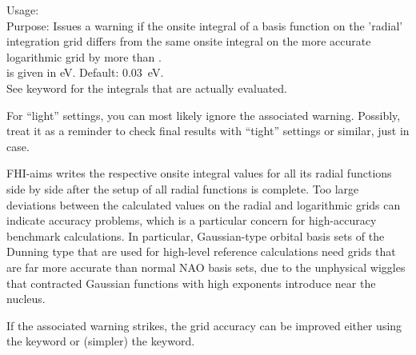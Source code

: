 



{
  \noindent
  Usage:   \\[1.0ex]
  Purpose: Issues a warning if the onsite integral of a basis function on 
    the 'radial' integration grid differs from the same onsite integral on
    the more accurate logarithmic grid by more than . \\[1.0ex]
   is given in eV. Default: 0.03~eV. \\
}
See keyword  
for the integrals that are actually evaluated.

For ``light'' settings, you can most likely ignore the associated warning. 
Possibly, treat it as a reminder to check final results with ``tight'' 
settings or similar, just in case.

FHI-aims writes the respective onsite integral values for all its
radial functions side by side after the setup of all radial functions
is complete. Too large deviations between the calculated values on the
radial and logarithmic grids can indicate accuracy problems, which is
a particular concern for high-accuracy benchmark calculations. In
particular, Gaussian-type orbital basis sets of the Dunning type that
are used for high-level reference calculations need grids that are far
more accurate than normal NAO basis sets, due to the unphysical
wiggles that contracted Gaussian functions with high exponents
introduce near the nucleus.

If the associated warning strikes, the grid accuracy can be improved
either using the  keyword or (simpler) the
 keyword.

